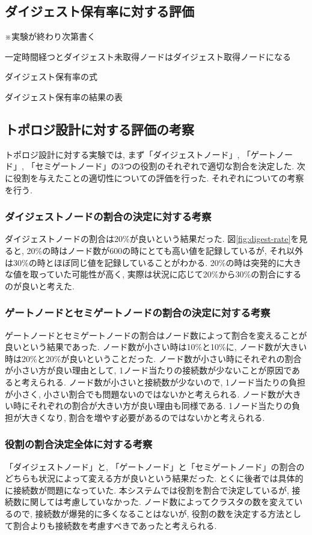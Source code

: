 \newpage

\subsection{ダイジェスト保有率に対する評価}
※実験が終わり次第書く

一定時間経つとダイジェスト未取得ノードはダイジェスト取得ノードになる

ダイジェスト保有率の式

ダイジェスト保有率の結果の表

\subsection{トポロジ設計に対する評価の考察}
トポロジ設計に対する実験では, まず「ダイジェストノード」, 「ゲートノード」, 「セミゲートノード」の3つの役割のそれぞれで適切な割合を決定した. 次に役割を与えたことの適切性についての評価を行った. それぞれについての考察を行う.

\subsubsection{ダイジェストノードの割合の決定に対する考察}
ダイジェストノードの割合は20\%が良いという結果だった. 図\ref{fig:digest-rate}を見ると, 20\%の時はノード数が600の時にとても高い値を記録しているが, それ以外は30\%の時とほぼ同じ値を記録していることがわかる. 20\%の時は突発的に大きな値を取っていた可能性が高く, 実際は状況に応じて20\%から30\%の割合にするのが良いと考えた.

\subsubsection{ゲートノードとセミゲートノードの割合の決定に対する考察}
ゲートノードとセミゲートノードの割合はノード数によって割合を変えることが良いという結果であった. ノード数が小さい時は10\%と10\%に, ノード数が大きい時は20\%と20\%が良いということだった. ノード数が小さい時にそれぞれの割合が小さい方が良い理由として, 1ノード当たりの接続数が少ないことが原因であると考えられる. ノード数が小さいと接続数が少ないので, 1ノード当たりの負担が小さく, 小さい割合でも問題ないのではないかと考えられる. ノード数が大きい時にそれぞれの割合が大きい方が良い理由も同様である. 1ノード当たりの負担が大きくなり, 割合を増やす必要があるのではないかと考えられる.

\subsubsection{役割の割合決定全体に対する考察}
「ダイジェストノード」と, 「ゲートノード」と「セミゲートノード」の割合のどちらも状況によって変える方が良いという結果だった. とくに後者では具体的に接続数が問題になっていた. 本システムでは役割を割合で決定しているが, 接続数に関しては考慮していなかった. ノード数によってクラスタの数を変えているので, 接続数が爆発的に多くなることはないが, 役割の数を決定する方法として割合よりも接続数を考慮すべきであったと考えられる.

